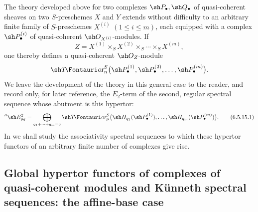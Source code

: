 \begin{env}[6.5.15]
\label{III.6.5.15}
The theory developed above for two complexes
$\sh P_\bullet,\sh Q_\bullet$ of quasi-coherent sheaves on two
$S$-preschemes $X$ and $Y$ extends without difficulty to an
arbitrary finite family of $S$-preschemes $X^{(i)}$
$(1\leq i\leq m)$, each equipped with a complex
$\sh P_\bullet^{(i)}$ of quasi-coherent
$\sh O_{X^{(i)}}$-modules.  If
\[
  Z=X^{(1)}\times_SX^{(2)}\times_S\cdots\times_SX^{(m)},
\]
one thereby defines a quasi-coherent $\sh O_Z$-module
\[
  \shTor_n^S
  \bigl(\sh P_\bullet^{(1)},\sh P_\bullet^{(2)},\ldots,
        \sh P_\bullet^{(m)}\bigr).
\]
We leave the development of the theory in this general case to
the reader, and record only, for later reference, the $E_2$-term
of the second, regular spectral sequence whose abutment is this
hypertor:
\[
  ''\sh E_{pq}^2
  =
  \bigoplus_{q_1+\cdots+q_m=q}
  \shTor_p^S
  \bigl(
    \sh H_{q_1}(\sh P_\bullet^{(1)}),\ldots,
    \sh H_{q_m}(\sh P_\bullet^{(m)})
  \bigr).
  \tag{6.5.15.1}\label{III.6.5.15.1}
\]
In  we shall study the associativity spectral
sequences to which these hypertor functors of an arbitrary
finite number of complexes give rise.
\end{env}


\subsection{Global hypertor functors of complexes of
quasi-coherent modules and K\"unneth spectral sequences: the
affine-base case}
\label{subsection:III.6.6}

